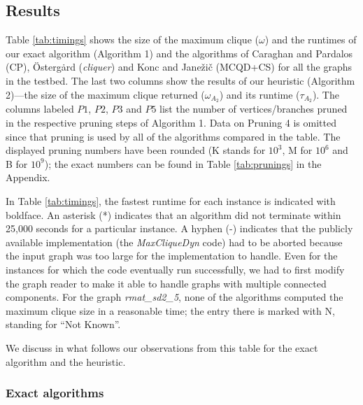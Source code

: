 \subsection{Results}

\label{sec:exp-results}
%



Table \ref{tab:timings} shows the size of the maximum clique ($\omega$) and the runtimes  of our exact algorithm (Algorithm 1) and the algorithms of Caraghan and Pardalos (CP), 
\"{O}sterg\.{a}rd ({\it cliquer}) 
and Konc and Jane\v{z}i\v{c}  (MCQD+CS) for all the graphs in the testbed. 
The last two columns show the results of our heuristic (Algorithm 2)---the size of the maximum clique 
returned ($\omega_{A_2}$)  and its runtime ($\tau_{A_2}$). 
The columns labeled $P1$, $P2$, $P3$ and $P5$ list the number of 
vertices/branches pruned in the respective pruning steps of Algorithm 1.
Data on Pruning 4 is omitted since that pruning is used by all of the algorithms compared in the table. The displayed pruning numbers have been rounded  (K stands for $10^3$, M for $10^6$ and B for $10^9$);
the exact numbers can be found in Table \ref{tab:prunings} in the Appendix.

In Table \ref{tab:timings}, the fastest runtime for each instance is indicated with boldface. 
An asterisk (*) indicates that an algorithm did not terminate within 25,000 seconds for a particular
instance. A hyphen (-) indicates that the publicly available implementation 
(the {\it MaxCliqueDyn} code) had to be aborted because the input graph was too large 
for the implementation to handle. Even for the instances for which the code
eventually run successfully, we had to first modify 
the graph reader to make it able to handle graphs with multiple connected components.
For the graph {\it rmat\_sd2\_5}, none of the algorithms computed the maximum clique size in 
a reasonable time; the entry there is marked with N, standing for  ``Not Known''.

We discuss in what follows our observations from this table
for the exact algorithm and the heuristic.

\subsubsection{Exact algorithms}
\label{sec:exp-exact}

